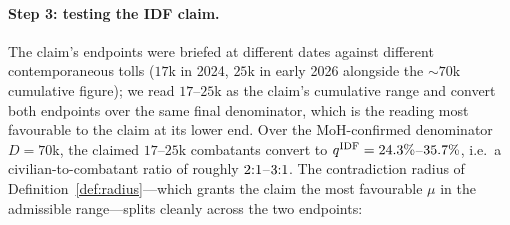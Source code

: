 \paragraph{Step 3: testing the IDF claim.} The claim's endpoints were briefed at different dates against different contemporaneous tolls ($17$k in 2024, $25$k in early 2026 alongside the ${\sim}70$k cumulative figure); we read $17$--$25$k as the claim's cumulative range and convert both endpoints over the same final denominator, which is the reading most favourable to the claim at its lower end. Over the MoH-confirmed denominator $D=70$k, the claimed $17$--$25$k combatants convert to $q^{\mathrm{IDF}}=24.3{}\%$--$35.7{}\%$, i.e.\ a civilian-to-combatant ratio of roughly $2{}{:}1$--$3{}{:}1$. The contradiction radius of Definition~\ref{def:radius}---which grants the claim the most favourable $\mu$ in the admissible range---splits cleanly across the two endpoints:
